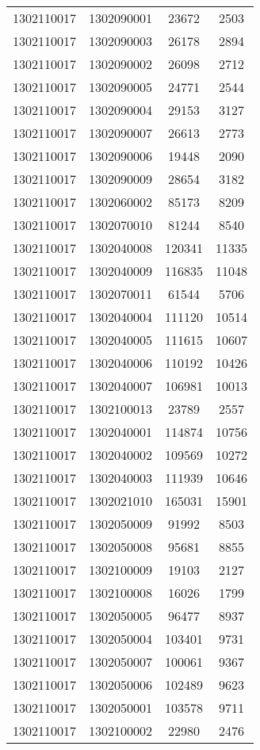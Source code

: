 \begin{longtable}[h]{llcc}
		1302110017 & 1302090001 & 23672 & 2503\\
		1302110017 & 1302090003 & 26178 & 2894\\
		1302110017 & 1302090002 & 26098 & 2712\\
		1302110017 & 1302090005 & 24771 & 2544\\
		1302110017 & 1302090004 & 29153 & 3127\\
		1302110017 & 1302090007 & 26613 & 2773\\
		1302110017 & 1302090006 & 19448 & 2090\\
		1302110017 & 1302090009 & 28654 & 3182\\
		1302110017 & 1302060002 & 85173 & 8209\\
		1302110017 & 1302070010 & 81244 & 8540\\
		1302110017 & 1302040008 & 120341 & 11335\\
		1302110017 & 1302040009 & 116835 & 11048\\
		1302110017 & 1302070011 & 61544 & 5706\\
		1302110017 & 1302040004 & 111120 & 10514\\
		1302110017 & 1302040005 & 111615 & 10607\\
		1302110017 & 1302040006 & 110192 & 10426\\
		1302110017 & 1302040007 & 106981 & 10013\\
		1302110017 & 1302100013 & 23789 & 2557\\
		1302110017 & 1302040001 & 114874 & 10756\\
		1302110017 & 1302040002 & 109569 & 10272\\
		1302110017 & 1302040003 & 111939 & 10646\\
		1302110017 & 1302021010 & 165031 & 15901\\
		1302110017 & 1302050009 & 91992 & 8503\\
		1302110017 & 1302050008 & 95681 & 8855\\
		1302110017 & 1302100009 & 19103 & 2127\\
		1302110017 & 1302100008 & 16026 & 1799\\
		1302110017 & 1302050005 & 96477 & 8937\\
		1302110017 & 1302050004 & 103401 & 9731\\
		1302110017 & 1302050007 & 100061 & 9367\\
		1302110017 & 1302050006 & 102489 & 9623\\
		1302110017 & 1302050001 & 103578 & 9711\\
		1302110017 & 1302100002 & 22980 & 2476\\

\end{longtable}
